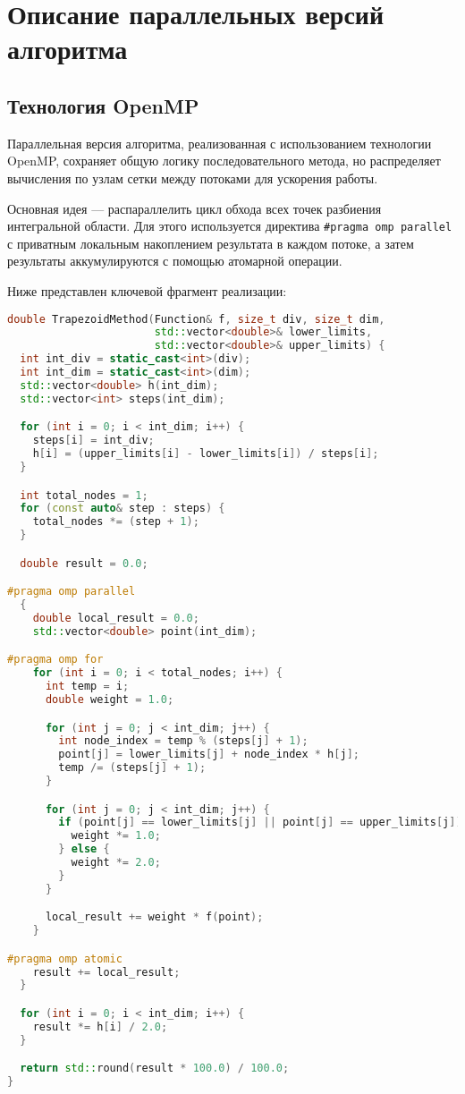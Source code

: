 \documentclass[a4paper,14pt]{article}
\begin{document}
\newpage
\section{Описание параллельных версий алгоритма}
\subsection{Технология OpenMP}

Параллельная версия алгоритма, реализованная с использованием технологии OpenMP, сохраняет общую логику последовательного метода, но распределяет вычисления по узлам сетки между потоками для ускорения работы.

Основная идея — распараллелить цикл обхода всех точек разбиения интегральной области. Для этого используется директива \- \texttt{\#pragma omp parallel} с приватным локальным накоплением результата в каждом потоке, а затем результаты аккумулируются с помощью атомарной операции.

Ниже представлен ключевой фрагмент реализации:

\begin{lstlisting}[language=C++]
double TrapezoidMethod(Function& f, size_t div, size_t dim,
                       std::vector<double>& lower_limits,
                       std::vector<double>& upper_limits) {
  int int_div = static_cast<int>(div);
  int int_dim = static_cast<int>(dim);
  std::vector<double> h(int_dim);
  std::vector<int> steps(int_dim);

  for (int i = 0; i < int_dim; i++) {
    steps[i] = int_div;
    h[i] = (upper_limits[i] - lower_limits[i]) / steps[i];
  }

  int total_nodes = 1;
  for (const auto& step : steps) {
    total_nodes *= (step + 1);
  }

  double result = 0.0;

#pragma omp parallel
  {
    double local_result = 0.0;
    std::vector<double> point(int_dim);

#pragma omp for
    for (int i = 0; i < total_nodes; i++) {
      int temp = i;
      double weight = 1.0;

      for (int j = 0; j < int_dim; j++) {
        int node_index = temp % (steps[j] + 1);
        point[j] = lower_limits[j] + node_index * h[j];
        temp /= (steps[j] + 1);
      }

      for (int j = 0; j < int_dim; j++) {
        if (point[j] == lower_limits[j] || point[j] == upper_limits[j]) {
          weight *= 1.0;
        } else {
          weight *= 2.0;
        }
      }

      local_result += weight * f(point);
    }

#pragma omp atomic
    result += local_result;
  }

  for (int i = 0; i < int_dim; i++) {
    result *= h[i] / 2.0;
  }

  return std::round(result * 100.0) / 100.0;
}
\end{lstlisting}
\end{document}
